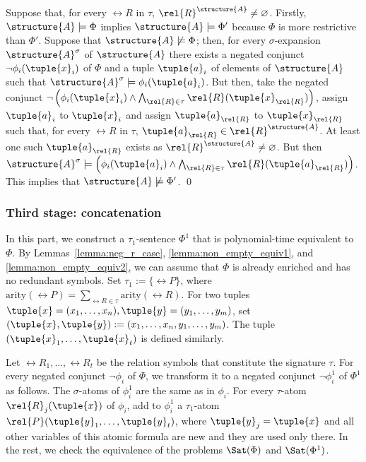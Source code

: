 \documentclass{lmcs}
\begin{document}
Suppose that, for every $\rel{R}$ in $\tau$, $\rel{R}^\structure{A}\not=\varnothing$. Firstly, $\structure{A}\models\Phi$ implies $\structure{A}\models\Phi'$ because $\Phi$ is more restrictive than $\Phi'$.
Suppose that $\structure{A}\not\models\Phi$; then, for every $\sigma$-expansion $\structure{A}^\sigma$ of $\structure{A}$ there exists a negated conjunct $\neg\phi_i(\tuple{x}_i)$ of $\Phi$ and a tuple $\tuple{a}_i$ of elements of $\structure{A}$ such that $\structure{A}^\sigma\models\phi_i(\tuple{a}_i)$.
But then, take the negated conjunct $\neg\left(\phi_i(\tuple{x}_i)\wedge\bigwedge_{\rel{R}\in\tau}\rel{R}(\tuple{x}_\rel{R})\right)$, assign $\tuple{a}_i$ to $\tuple{x}_i$ and assign $\tuple{a}_\rel{R}$ to $\tuple{x}_\rel{R}$ such that, for every $\rel{R}$ in $\tau$, $\tuple{a}_\rel{R}\in\rel{R}^\structure{A}$.
At least one such $\tuple{a}_\rel{R}$ exists as $\rel{R}^\structure{A}\not=\varnothing$.
But then $\structure{A}^\sigma\models\left(\phi_i(\tuple{a}_i)\wedge\bigwedge_{\rel{R}\in\tau}\rel{R}(\tuple{a}_\rel{R})\right)$.
This implies that $\structure{A}\not\models\Phi'$.
\qed

\subsubsection*{Third stage: concatenation}\label{constr:concatenation} In this part, we construct a $\tau_1$-sentence $\Phi^1$ that is polynomial-time equivalent to $\Phi$.
By Lemmas~\ref{lemma:neg_r_case}, \ref{lemma:non_empty_equiv1}, and \ref{lemma:non_empty_equiv2}, we can assume that $\Phi$ is already enriched and has no redundant symbols.
Set $\tau_1 := \{\rel{P}\}$, where $\mathrm{arity}(\rel{P}) = \sum_{\rel{R}\in\tau}\mathrm{arity}(\rel{R})$. For two tuples $\tuple{x}=(x_1,\ldots,x_n),\tuple{y}=(y_1,\ldots,y_m)$, set $(\tuple{x},\tuple{y}):=(x_1,\ldots,x_n,y_1,\ldots,y_m)$.
The tuple $(\tuple{x}_1,\ldots,\tuple{x}_t)$ is defined similarly.

Let $\rel{R}_1,\ldots,\rel{R}_t$ be the relation symbols that constitute the signature $\tau$. For every negated conjunct $\neg\phi_i$ of $\Phi$, we transform it to a negated conjunct $\neg\phi_i^1$ of $\Phi^1$ as follows.
The $\sigma$-atoms of $\phi_i^1$ are the same as in $\phi_i$. For every $\tau$-atom $\rel{R}_j(\tuple{x})$ of $\phi_i$, add to $\phi_i^1$ a $\tau_1$-atom $\rel{P}(\tuple{y}_1,\ldots,\tuple{y}_t)$, where $\tuple{y}_j=\tuple{x}$ and all other variables of this atomic formula are new and they are used only there.
In the rest, we check the equivalence of the problems $\Sat(\Phi)$ and $\Sat(\Phi^1)$. 
\end{document}

